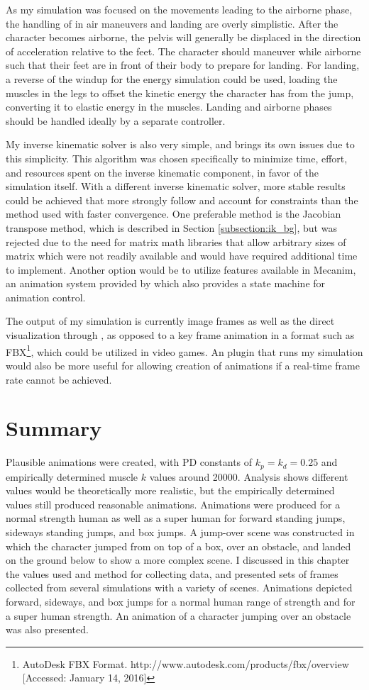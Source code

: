As my simulation was focused on the movements leading to the airborne phase, the handling of in air maneuvers and landing are overly simplistic.  After the character becomes airborne, the pelvis will generally be displaced in the direction of acceleration relative to the feet.  The character should maneuver while airborne such that their feet are in front of their body to prepare for landing.  For landing, a reverse of the windup for the energy simulation could be used, loading the muscles in the legs to offset the kinetic energy the character has from the jump, converting it to elastic energy in the muscles.  Landing and airborne phases should be handled ideally by a separate controller.

My inverse kinematic solver is also very simple, and brings its own issues due to this simplicity.  This algorithm was chosen specifically to minimize time, effort, and resources spent on the inverse kinematic component, in favor of the simulation itself.  With a different inverse kinematic solver, more stable results could be achieved that more strongly follow and account for constraints than the method used with faster convergence.  One preferable method is the Jacobian transpose method, which is described in Section \ref{subsection:ik_bg}, but was rejected due to the need for matrix math libraries that allow arbitrary sizes of matrix which were not readily available and would have required additional time to implement.  Another option would be to utilize features available in Mecanim, an animation system provided by \unity{} which also provides a state machine for animation control.

The output of my simulation is currently image frames as well as the direct visualization through \unity{}, as opposed to a key frame animation in a format such as FBX\footnote{AutoDesk FBX Format. http://www.autodesk.com/products/fbx/overview [Accessed: January 14, 2016]}, which could be utilized in video games.  An \maya{}  plugin that runs my simulation would also be more useful for allowing creation of animations if a real-time frame rate cannot be achieved.

\section{Summary}
\label{section:results_summary}
Plausible animations were created, with PD constants of $k_p = k_d = 0.25$ and empirically determined muscle $k$ values around 20000.  Analysis shows different values would be theoretically more realistic, but the empirically determined values still produced reasonable animations.  Animations were produced for a normal strength human as well as a super human for forward standing jumps, sideways standing jumps, and box jumps.  A jump-over scene was constructed in which the character jumped from on top of a box, over an obstacle, and landed on the ground below to show a more complex scene.  I discussed in this chapter the values used and method for collecting data, and presented sets of frames collected from several simulations with a variety of scenes.  Animations depicted forward, sideways, and box jumps for a normal human range of strength and for a super human strength.  An animation of a character jumping over an obstacle was also presented.